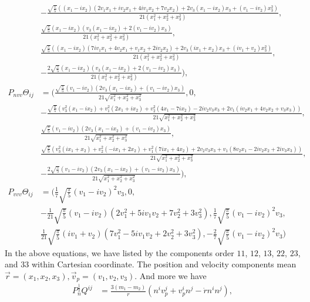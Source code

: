 \documentclass[prd,aps,a4paper,superscriptaddress,twocolumn,footinbib,showpacs]{revtex4}
\begin{document}
\begin{widetext}
\begin{align}
&-\frac{\sqrt{\frac{\pi }{5}} \left((x_1-i x_2) (2 v_1 x_1+i v_2 x_1+4 i v_1 x_2+7 v_2 x_2)+2 v_3 (x_1-i x_2) x_3+(v_1-i v_2) x_3^2\right)}{21 \left(x_1^2+x_2^2+x_3^2\right)},\nonumber\\
&\frac{\sqrt{\frac{\pi }{5}} (x_1-i x_2) (v_3 (x_1-i x_2)+2 (v_1-i v_2) x_3)}{21 \left(x_1^2+x_2^2+x_3^2\right)},\nonumber\\
&\frac{\sqrt{\frac{\pi }{5}} \left((x_1-i x_2) (7 i v_1 x_1+4 v_2 x_1+v_1 x_2+2 i v_2 x_2)+2 v_3 (i x_1+x_2) x_3+(i v_1+v_2) x_3^2\right)}{21 \left(x_1^2+x_2^2+x_3^2\right)},\nonumber\\
&-\frac{2 \sqrt{\frac{\pi }{5}} (x_1-i x_2) (v_3 (x_1-i x_2)+2 (v_1-i v_2) x_3)}{21 \left(x_1^2+x_2^2+x_3^2\right)}),\\
P_{nvv}\Theta_{ij}&=(\frac{\sqrt{\frac{\pi }{5}} (v_1-i v_2) (2 v_3 (x_1-i x_2)+(v_1-i v_2) x_3)}{21 \sqrt{x_1^2+x_2^2+x_3^2}},0,\nonumber\\
&-\frac{\sqrt{\frac{\pi }{5}} \left(v_3^2 (x_1-i x_2)+v_1^2 (2 x_1+i x_2)+v_2^2 (4 x_1-7 i x_2)-2 i v_2 v_3 x_3+2 v_1 (i v_2 x_1+4 v_2 x_2+v_3 x_3)\right)}{21 \sqrt{x_1^2+x_2^2+x_3^2}},\nonumber\\
&\frac{\sqrt{\frac{\pi }{5}} (v_1-i v_2) (2 v_3 (x_1-i x_2)+(v_1-i v_2) x_3)}{21 \sqrt{x_1^2+x_2^2+x_3^2}},\nonumber\\
&\frac{\sqrt{\frac{\pi }{5}} \left(v_3^2 (i x_1+x_2)+v_2^2 (-i x_1+2 x_2)+v_1^2 (7 i x_1+4 x_2)+2 v_2 v_3 x_3+v_1 (8 v_2 x_1-2 i v_2 x_2+2 i v_3 x_3)\right)}{21 \sqrt{x_1^2+x_2^2+x_3^2}},\nonumber\\
&-\frac{2 \sqrt{\frac{\pi }{5}} (v_1-i v_2) (2 v_3 (x_1-i x_2)+(v_1-i v_2) x_3)}{21 \sqrt{x_1^2+x_2^2+x_3^2}}),\\
P_{vvv}\Theta_{ij}&=(\frac{1}{7} \sqrt{\frac{\pi }{5}} (v_1-i v_2)^2 v_3,0,\nonumber\\
&-\frac{1}{21} \sqrt{\frac{\pi }{5}} (v_1-i v_2) \left(2 v_1^2+5 i v_1 v_2+7 v_2^2+3 v_3^2\right),\frac{1}{7} \sqrt{\frac{\pi }{5}} (v_1-i v_2)^2 v_3,\nonumber\\
&\frac{1}{21} \sqrt{\frac{\pi }{5}} (i v_1+v_2) \left(7 v_1^2-5 i v_1 v_2+2 v_2^2+3 v_3^2\right),-\frac{2}{7} \sqrt{\frac{\pi }{5}} (v_1-i v_2)^2 v_3)
\end{align}
In the above equations, we have listed by the components order $11$, $12$, $13$, $22$, $23$, and $33$ within Cartesian coordinate. The position and velocity components mean $\vec{r}=(x_1,x_2,x_3), \vec{v}_p=(v_1,v_2,v_3)$. And more we have
\begin{align}
P_n^{\frac{1}{2}}Q^{ij}&=\frac{3(m_1-m_2)}{r}(n^iv_p^j+v_p^in^j-\dot{r}n^in^j),\\

\end{align}
\end{widetext}
\end{document}
